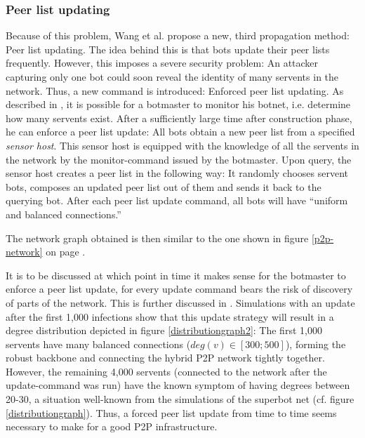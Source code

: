 \documentclass{llncs}
\begin{document}
\subsubsection{Peer list updating}
Because of this problem, Wang et al. propose a new, third propagation
method: Peer list updating. The idea behind this is that bots update
their peer lists frequently. However, this imposes a severe security
problem: An attacker capturing only one bot could soon reveal the
identity of many servents in the network. Thus, a new command is
introduced: Enforced peer list updating. As described in \cite{td1sc},
it is possible for a botmaster to monitor his botnet, i.e. determine
how many servents exist. After a sufficiently large time after
construction phase, he can enforce a peer list update: All bots obtain
a new peer list from a specified {\it sensor host}. This sensor host
is equipped with the knowledge of all the servents in the network by
the monitor-command issued by the botmaster. Upon query, the sensor
host creates a peer list in the following way: It randomly chooses
servent bots, composes an updated peer list out of them and sends it
back to the querying bot. After each peer list update command, all
bots will have ``uniform and balanced connections.''\cite{td1sc}

The network graph obtained is then similar to the one shown in figure
\ref{p2p-network} on page \pageref{p2p-network}.

It is to be discussed at which point in time it makes sense for the
botmaster to enforce a peer list update, for every update command
bears the risk of discovery of parts of the network. This is further
discussed in \cite{td1sc}. Simulations with an update after the first
1,000 infections show that this update strategy will result in a
degree distribution depicted in figure \ref{distributiongraph2}: The
first 1,000 servents have many balanced connections ($deg(v) \in
[300;500]$), forming the robust backbone and connecting the hybrid P2P
network tightly together. However, the remaining 4,000 servents
(connected to the network after the update-command was run) have the
known symptom of having degrees between 20-30, a situation well-known
from the simulations of the superbot net (cf. figure
\ref{distributiongraph}). Thus, a forced peer list update from time to
time seems necessary to make for a good P2P infrastructure.
\end{document}
